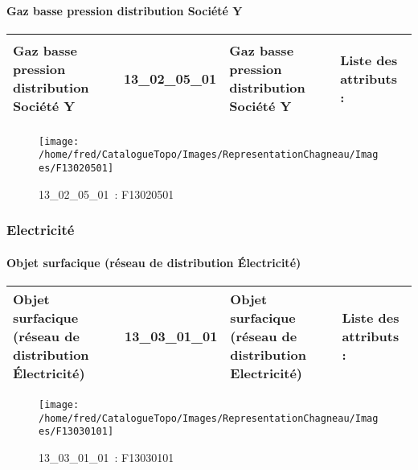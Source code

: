 \documentclass[12pt,titlepage,oneside]{book}
\begin{document}
\paragraph{Gaz basse pression distribution Société Y}
\noindent
\vspace{\baselineskip}

\renewcommand{\arraystretch}{1.2}
\begin{supertabular}{|p{10cm}|c|p{13cm}|p{12cm}|}
 Gaz basse pression distribution Société Y & 13\_02\_05\_01 & Gaz basse pression distribution Société Y & Liste des attributs :
\begin{enumerate}
\end{enumerate}
\\
\hline
\end{supertabular}
\begin{figure}[h!]
  \hfill         %
  \begin{minipage}[t]{3cm}
    \begin{center}
      \texttt{[image: /home/fred/CatalogueTopo/Images/RepresentationChagneau/Images/F13020501]}
      \caption[~13\_02\_05\_01]{\small{13\_02\_05\_01~:} \tiny{F13020501}}\label{F13020501}
    \end{center}
  \end{minipage}
\end{figure}

\subsubsection{\large Electricité}
\paragraph{Objet surfacique (réseau de distribution Électricité)}
\noindent
\vspace{\baselineskip}

\renewcommand{\arraystretch}{1.2}
\begin{supertabular}{|p{10cm}|c|p{13cm}|p{12cm}|}
 Objet surfacique (réseau de distribution Électricité) & 13\_03\_01\_01 & Objet surfacique (réseau de distribution Electricité) & Liste des attributs :
\begin{enumerate}
\end{enumerate}
\\
\hline
\end{supertabular}
\begin{figure}[h!]
  \hfill         %
  \begin{minipage}[t]{3cm}
    \begin{center}
      \texttt{[image: /home/fred/CatalogueTopo/Images/RepresentationChagneau/Images/F13030101]}
      \caption[~13\_03\_01\_01]{\small{13\_03\_01\_01~:} \tiny{F13030101}}\label{F13030101}
    \end{center}
  \end{minipage}
\end{figure}
\end{document}
